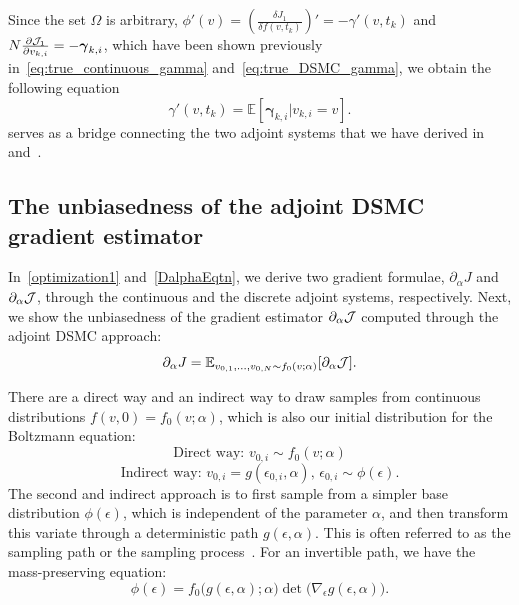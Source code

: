 \documentclass[times,final,nopreprintline]{elsarticle}
\newcommand{\bgamma}{\boldsymbol \gamma}
\newtheorem{theorem}{Theorem}
\begin{document}
Since the set $\Omega$ is arbitrary, $\phi'(v) =(\frac{\delta J_1}{\delta f(v,t_k)})' = -\gamma'(v,t_k)$ and $ N\frac{\partial \cJ_1}{\partial v_{k,i}} =- \bgamma_{k,i}$, which have been shown previously in~\eqref{eq:true_continuous_gamma} and~\eqref{eq:true_DSMC_gamma}, we obtain the following equation 
\begin{equation} \label{eq:dJ4}
\gamma'(v,t_k)   = \mathbb E[\bgamma_{k,i}|v_{k,i}=v].
\end{equation}
 serves as a bridge connecting the two adjoint systems that we have derived in~ and~.


\subsection{The unbiasedness of the adjoint DSMC gradient estimator}
In~\eqref{optimization1} and~\eqref{DalphaEqtn}, we derive two gradient formulae, $\partial_\alpha J$ and $\partial_\alpha \mathcal J$, through the continuous and the discrete adjoint systems, respectively. Next, we show the unbiasedness of the gradient estimator $\partial_\alpha \mathcal J$ computed through the adjoint DSMC approach:
\begin{equation}
    \partial_\alpha J = \mathbb{E}_{v_{0,1},\ldots, v_{0,N}\sim f_0(v;\alpha)}[\partial_\alpha \mathcal J]. 
\end{equation}

There are a direct way and an indirect way to draw samples from continuous distributions $f(v,0) = f_0(v; \alpha)$, which is also our initial distribution for the Boltzmann equation:
\[
\text{Direct way: }v_{0,i} \sim f_0(v;\alpha)\]
\[
\text{Indirect way: }v_{0,i} = g(\epsilon_{0,i},\alpha),\, \epsilon_{0,i} \sim \phi(\epsilon).
\]
The second and indirect approach is to first sample from a simpler base distribution $\phi(\epsilon)$, which is independent of the parameter $\alpha$, and then transform this variate through a deterministic path $ g(\epsilon,\alpha)$. This is often referred to as the sampling path or the sampling process~\cite{glasserman2013monte,mohamed2019monte}. For an invertible path, we have the mass-preserving equation:
\begin{equation} \label{eq:mass-preserving}
   \phi(\epsilon) =   f_0\Big(g(\epsilon,\alpha);\alpha\Big) \det{ \Big(\nabla_\epsilon g(\epsilon,\alpha) \Big)}  .
\end{equation} 
\end{document}

